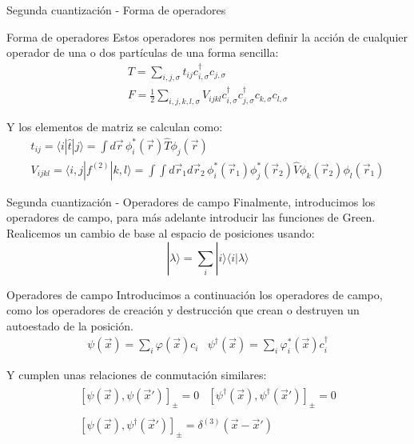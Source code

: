 \documentclass{beamer}
\begin{document}
\begin{frame}{Segunda cuantización - Forma de operadores \cite{LibroQuantum} \cite{Sakurai_Napolitano_2020}}
    \begin{block}{Forma de operadores}
        Estos operadores nos permiten definir la acción de cualquier operador de una o dos partículas de una forma sencilla:
        \begin{align}
            T = \sum_{i, j, \sigma} t_{ij}c_{i, \sigma}^{\dagger}c_{j, \sigma} \\
            F = \frac{1}{2}\sum_{i, j, k, l, \sigma} V_{ijkl}c_{i, \sigma}^{\dagger}c_{j, \sigma}^{\dagger}c_{k, \sigma} c_{l, \sigma}
            \label{eq:sqOperators}
        \end{align}
    \end{block}
    Y los elementos de matriz se calculan como:
    \begin{equation}
        \begin{split}
            t_{ij} = \langle i | \hat{t} | j \rangle = \int d\vec{r} \, \phi_i^*(\vec{r}) \hat{T} \phi_j(\vec{r}) \\ V_{ijkl} = \langle i, j | f^{(2)} | k, l \rangle = \int\int d\vec{r}_1 d\vec{r}_2 \, \phi_i^*(\vec{r}_1) \phi_j^*(\vec{r}_2) \hat{V} \phi_k(\vec{r}_2) \phi_l(\vec{r}_1)
        \end{split}
    \end{equation}
\end{frame}
\begin{frame}{Segunda cuantización - Operadores de campo \cite{LibroQuantum} \cite{Sakurai_Napolitano_2020}}
    Finalmente, introducimos los operadores de campo, para más adelante introducir las funciones de Green. Realicemos un cambio de base al espacio de posiciones usando:
    $$
    |\lambda\rangle = \sum_i |i\rangle\langle i|\lambda\rangle
    $$
    \begin{block}{Operadores de campo}
        Introducimos a continuación los operadores de campo, como los operadores de creación y destrucción que crean o destruyen un autoestado de la posición.
        \begin{equation}
            \begin{array}{cc}
                \psi(\vec{x}) = \sum_i \varphi (\vec{x}) c_i & \psi^{\dagger} (\vec{x}) = \sum_i \varphi_i^* (\vec{x}) c_i^{\dagger}
            \end{array}
        \label{eq:FieldOps}
        \end{equation}
    \end{block}
    Y cumplen unas relaciones de conmutación similares:
    \begin{align*}
        \begin{array}{cc}
            [\psi(\vec{x}), \psi(\vec{x}')]_{\pm} = 0 & [\psi^{\dagger}(\vec{x}), \psi^{\dagger}(\vec{x}')]_{\pm} = 0
            \end{array} \\
        \begin{array}{c}
        [\psi(\vec{x}), \psi^{\dagger}(\vec{x}')]_{\pm} = \delta^{(3)} (\vec{x} - \vec{x}')
    \end{array}
    \end{align*}
\end{frame}
\end{document}
